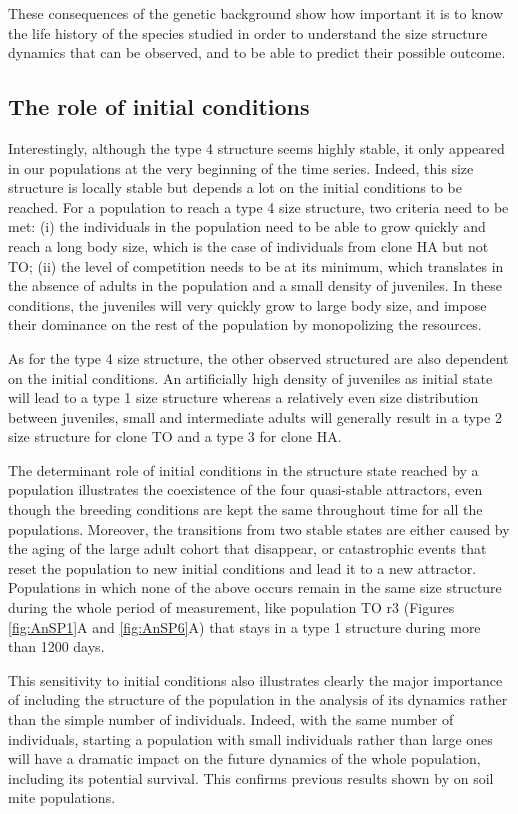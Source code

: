 These consequences of the genetic background show how important it is to know
the life history of the species studied in order to understand the size
structure dynamics that can be observed, and to be able to predict their
possible outcome.

\subsection{The role of initial conditions}

Interestingly, although the type 4 structure seems highly stable, it only
appeared in our populations at the very beginning of the time series. Indeed,
this size structure is locally stable but depends a lot on the initial
conditions to be reached. For a population to reach a type 4 size structure, two
criteria need to be met: (i) the individuals in the population need to be able
to grow quickly and reach a long body size, which is the case of individuals
from clone HA but not TO; (ii) the level of competition needs to be at its
minimum, which translates in the absence of adults in the population and a small
density of juveniles. In these conditions, the juveniles will very quickly grow
to large body size, and impose their dominance on the rest of the population by
monopolizing the resources.

As for the type 4 size structure, the other observed structured are also
dependent on the initial conditions. An artificially high density of juveniles
as initial state will lead to a type 1 size structure whereas a relatively even
size distribution between juveniles, small and intermediate adults will
generally result in a type 2 size structure for clone TO and a type 3 for clone
HA.

The determinant role of initial conditions in the structure state reached by a
population illustrates the coexistence of the four quasi-stable attractors, even
though the breeding conditions are kept the same throughout time for all the
populations. Moreover, the transitions from two stable states are either caused
by the aging of the large adult cohort that disappear, or catastrophic events
that reset the population to new initial conditions and lead it to a new
attractor. Populations in which none of the above occurs remain in the same size
structure during the whole period of measurement, like population TO r3 (Figures
\ref{fig:AnSP1}A and \ref{fig:AnSP6}A) that stays in a type 1 structure during more than 1200
days.

This sensitivity to initial conditions also illustrates clearly the major
importance of including the structure of the population in the analysis of its
dynamics rather than the simple number of individuals. Indeed, with the same
number of individuals, starting a population with small individuals rather than
large ones will have a dramatic impact on the future dynamics of the whole
population, including its potential survival. This confirms previous results
shown by \textcites{benton2005a} on soil mite populations.

